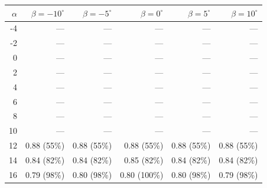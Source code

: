 \begin{tabular}{rrrrrr}
  \hline
  $\alpha$ & $\beta=-10^\circ$ & $\beta=-5^\circ$ & $\beta=0^\circ$ & $\beta=5^\circ$ & $\beta=10^\circ$ \\
  \hline
     -4 & --- & --- & --- & --- & --- \\
     -2 & --- & --- & --- & --- & --- \\
      0 & --- & --- & --- & --- & --- \\
      2 & --- & --- & --- & --- & --- \\
      4 & --- & --- & --- & --- & --- \\
      6 & --- & --- & --- & --- & --- \\
      8 & --- & --- & --- & --- & --- \\
     10 & --- & --- & --- & --- & --- \\
     12 & 0.88 (55\%) & 0.88 (55\%) & 0.88 (55\%) & 0.88 (55\%) & 0.88 (55\%) \\
     14 & 0.84 (82\%) & 0.84 (82\%) & 0.85 (82\%) & 0.84 (82\%) & 0.84 (82\%) \\
     16 & 0.79 (98\%) & 0.80 (98\%) & 0.80 (100\%) & 0.80 (98\%) & 0.79 (98\%) \\
  \hline
\end{tabular}

